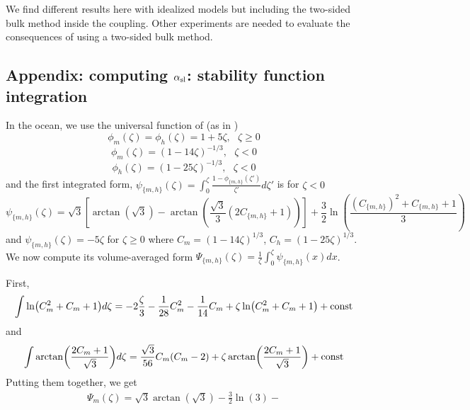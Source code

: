 We find different results here with idealized models but including
the {two-sided} bulk method inside the coupling.
Other experiments are needed to evaluate the consequences of
using a two-sided bulk method.

\begin{subappendices}
\section{Appendix: computing $\alpha_{\rm sl}$: stability function integration}
\label{sec:ND_Ocean_stabilityFunctionIntegration}
In the ocean, we use the universal function of \citep{large_similarity_2019} (as in \citep{pelletier_two-sided_2021})
\begin{equation}
	\phi_m(\zeta) = \phi_h(\zeta) = 1+5\zeta, ~~~ \zeta \geq 0
\end{equation}
\begin{equation}
	\phi_m(\zeta) = (1-14\zeta)^{-1/3}, ~~~ \zeta < 0
\end{equation}
\begin{equation}
	\phi_h(\zeta) = (1-25\zeta)^{-1/3}, ~~~ \zeta < 0
\end{equation}
and the first integrated form, $\psi_{\{m,h\}}(\zeta)= \int_0^\zeta \frac{1-\phi_{\{m,h\}}(\zeta')}{\zeta'}d\zeta'$ is for $\zeta<0$
\begin{equation}
	\psi_{\{m,h\}}(\zeta)  = \sqrt{3}\left[\arctan(\sqrt{3}) -
	\arctan\left(\frac{\sqrt{3}}{3}(2C_{\{m,h\}}+1)\right)\right]
	+ \frac{3}{2}\ln \left(\frac{(C_{\{m,h\}})^2 + C_{\{m,h\}} + 1}{3}\right)
\end{equation}
and $\psi_{\{m,h\}}(\zeta) = -5\zeta$ for $\zeta \geq 0$
where $C_m = (1-14\zeta)^{1/3}$, $C_h = (1-25\zeta)^{1/3}$.
We now compute its volume-averaged form $\Psi_{\{m,h\}}(\zeta)= \frac{1}{\zeta}\int_0^\zeta \psi_{\{m,h\}}(x)dx$.
\par
First,
\begin{equation}
	\int \ln (C_m^2+C_m+1)d\zeta
	= -2 \frac{\zeta}{3} - \frac{1}{28}C_m^2 - \frac{1}{14}C_m
	+\zeta\ln (C_m^2+C_m+1) + {\rm const}
\end{equation}
and
\begin{equation}
	\int \arctan (\frac{2C_m+1}{\sqrt{3}})d\zeta
	= \frac{\sqrt{3}}{56}C_m(C_m-2)
	+ \zeta \arctan (\frac{2C_m+1}{\sqrt{3}}) + {\rm const}
\end{equation}
Putting them together, we get
\begin{equation}
\begin{aligned}
	\Psi_m(\zeta)=\sqrt{3}\arctan(\sqrt{3})- 
	\frac{3}{2}\ln(3) -

\end{aligned}
\end{equation}
\end{subappendices}
